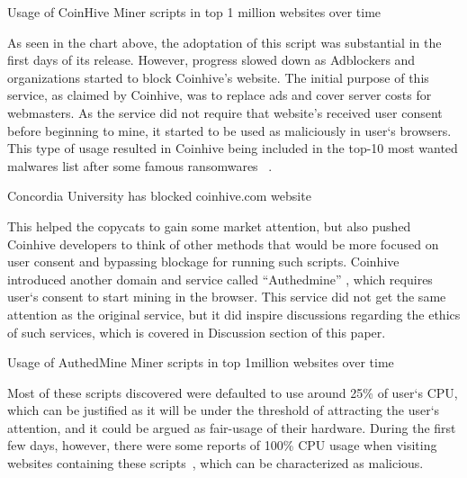 \begin{center}
	\caption{Usage of CoinHive Miner scripts in top 1 million websites over time}
\end{center}

As seen in the chart above, the adoptation of this script was substantial in the first days of its release. However, progress slowed down as Adblockers and organizations started to block Coinhive's website. The initial purpose of this service, as claimed by Coinhive, was to replace ads and cover server costs for webmasters. As the service did not require that website's received user consent before beginning to mine, it started to be used as maliciously in user`s browsers. This type of usage resulted in Coinhive being included in the top-10 most wanted malwares list after some famous ransomwares ~\cite{checkpoint}. 

\begin{center}
	\caption{Concordia University has blocked coinhive.com website}
\end{center}

This helped the copycats to gain some market attention, but also pushed Coinhive developers to think of other methods that would be more focused on user consent and bypassing blockage for running such scripts. Coinhive introduced another domain and service called ``Authedmine'' , which requires user`s consent to start mining in the browser. This service did not get the same attention as the original service, but it did inspire discussions regarding the ethics of such services, which is covered in Discussion section of this paper. 

\begin{center}
	\caption{Usage of AuthedMine Miner scripts in top 1million websites over time}
\end{center}

Most of these scripts discovered were defaulted to use around 25\% of user`s CPU, which can be justified as it will be under the threshold of attracting the user`s attention, and it could be argued as fair-usage of their hardware. During the first few days, however, there were some reports of 100\% CPU usage when visiting websites containing these scripts~\cite{piratesbayblog}, which can be characterized as malicious.

